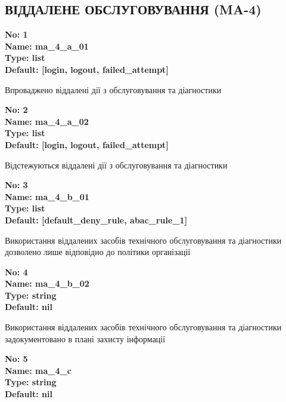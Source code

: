 \documentclass{article}
\begin{document}
\subsection{ВІДДАЛЕНЕ ОБСЛУГОВУВАННЯ (MA-4)}


\vspace{10pt}
{\footnotesize\bfseries
No: 1\\
Name: ma\_\allowbreak{}4\_\allowbreak{}a\_\allowbreak{}01\\
Type: list\\
Default: [\textquotedbl{}login\textquotedbl{}, \textquotedbl{}logout\textquotedbl{}, \textquotedbl{}failed\_\allowbreak{}attempt\textquotedbl{}]
}

{\footnotesize Впроваджено віддалені дії з обслуговування та діагностики}


{\footnotesize\bfseries
No: 2\\
Name: ma\_\allowbreak{}4\_\allowbreak{}a\_\allowbreak{}02\\
Type: list\\
Default: [\textquotedbl{}login\textquotedbl{}, \textquotedbl{}logout\textquotedbl{}, \textquotedbl{}failed\_\allowbreak{}attempt\textquotedbl{}]
}

{\footnotesize Відстежуються віддалені дії з обслуговування та діагностики}


{\footnotesize\bfseries
No: 3\\
Name: ma\_\allowbreak{}4\_\allowbreak{}b\_\allowbreak{}01\\
Type: list\\
Default: [\textquotedbl{}default\_\allowbreak{}deny\_\allowbreak{}rule\textquotedbl{}, \textquotedbl{}abac\_\allowbreak{}rule\_\allowbreak{}1\textquotedbl{}]
}

{\footnotesize Використання віддалених засобів технічного обслуговування та діагностики дозволено лише відповідно до політики організації}


{\footnotesize\bfseries
No: 4\\
Name: ma\_\allowbreak{}4\_\allowbreak{}b\_\allowbreak{}02\\
Type: string\\
Default: nil
}

{\footnotesize Використання віддалених засобів технічного обслуговування та діагностики задокументовано в плані захисту інформації}


{\footnotesize\bfseries
No: 5\\
Name: ma\_\allowbreak{}4\_\allowbreak{}c\\
Type: string\\
Default: nil
}
\end{document}
